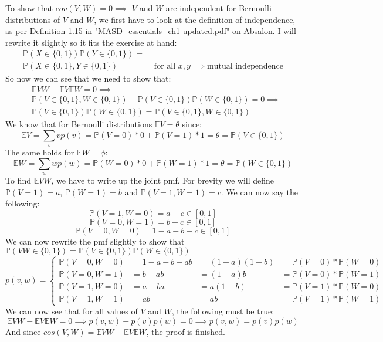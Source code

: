 To show that $cov(V,W) = 0 \implies$ $V$ and $W$ are independent for Bernoulli distributions of $V$ and $W$, we first have to look at the definition of independence, as per Definition 1.15 in "MASD\_essentials\_ch1-updated.pdf" on Absalon. I will rewrite it slightly so it fits the exercise at hand:\\

\begin{align*}
\mathbb{P}(X \in \{0,1\})\mathbb{P}(Y\in \{0,1\}) =& \\
\mathbb{P}(X\in \{0,1\},Y\in \{0,1\})&
\text{ for all }x,y \implies \text{mutual independence}
\end{align*}
So now we can see that we need to show that:
\begin{align*}
&\mathbb{E}VW-\mathbb{E}V \mathbb{E}W = 0 \implies \\
&\mathbb{P}(V\in \{0,1\},W\in \{0,1\})-\mathbb{P}(V \in \{0,1\})\mathbb{P}(W\in \{0,1\}) = 0 \implies \\
&\mathbb{P}(V\in \{0,1\})\mathbb{P}(W\in \{0,1\}) = \mathbb{P}(V\in \{0,1\},W\in \{0,1\})
\end{align*}
We know that for Bernoulli distributions $\mathbb{E}V = \theta$ since:
$$
\mathbb{E}V = \sum_v vp(v) = \mathbb{P}(V=0)*0+\mathbb{P}(V=1)*1 = \theta = \mathbb{P}(V\in \{0,1\})
$$
The same holds for $\mathbb{E}W = \phi$:
$$
\mathbb{E}W = \sum_w wp(w) = \mathbb{P}(W=0)*0+\mathbb{P}(W=1)*1 = \theta = \mathbb{P}(W\in \{0,1\})
$$
To find $\mathbb{E}VW$, we have to write up the joint pmf. For brevity we will define $\mathbb{P}(V = 1) = a$, $\mathbb{P}(W = 1) =b$ and $\mathbb{P}(V = 1,W=1) = c$. We can now say the following:
$$
\mathbb{P}(V=1,W=0) = a-c \in [0,1]
$$
$$
\mathbb{P}(V=0,W=1) = b-c \in [0,1]
$$
$$
\mathbb{P}(V=0,W=0) = 1 - a-b-c \in [0,1]
$$
We can now rewrite the pmf slightly to show that $\mathbb{P}(VW \in \{0,1\}) = \mathbb{P}(V \in \{0,1\})\mathbb{P}(W \in \{0,1\})$
$$
p(v,w)=
\left\{
\begin{array}{llll}
\mathbb{P}(V=0,W=0) & = 1 - a - b - ab & = (1-a)(1-b) & = \mathbb{P}(V=0)*\mathbb{P}(W=0) \\
\mathbb{P}(V=0,W=1) & = b - ab & = (1-a)b & = \mathbb{P}(V=0)*\mathbb{P}(W=1) \\
\mathbb{P}(V=1,W=0) & = a - ba & = a(1-b) & = \mathbb{P}(V=1)*\mathbb{P}(W=0) \\
\mathbb{P}(V=1,W=1) & = ab & = ab & = \mathbb{P}(V=1)*\mathbb{P}(W=1)
\end{array}
\right.
$$
%
%
We can now see that for all values of $V$ and $W$, the following must be true:
$$
\mathbb{E}VW-\mathbb{E}V \mathbb{E}W = 0 \implies p(v,w)-p(v)p(w) = 0 \implies p(v,w) = p(v)p(w)
$$
And since $cos(V,W)= \mathbb{E}VW-\mathbb{E}V \mathbb{E}W$, the proof is finished.